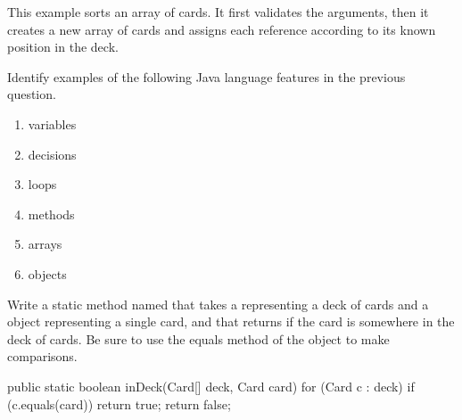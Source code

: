\begin{answer}[5em]
This example sorts an array of cards.
It first validates the arguments, then it creates a new array of cards and assigns each  reference according to its known position in the deck.
\end{answer}


\Q Identify examples of the following Java language features in the previous question.
\begin{enumerate}
\item variables 
\item decisions 
\item loops 
\item methods 
\item arrays 
\item objects 
\end{enumerate}



\Q \label{search}
Write a static method named  that takes a  representing a deck of cards and a  object representing a single card, and that returns  if the card is somewhere in the deck of cards. Be sure to use the equals method of the  object to make comparisons.

\vspace{-1ex}
\begin{answer}[11em]
\begin{javaans}
public static boolean inDeck(Card[] deck, Card card) {
    for (Card c : deck) {
        if (c.equals(card)) {
            return true;
        }
    }
    return false;
}
\end{javaans}
\end{answer}
